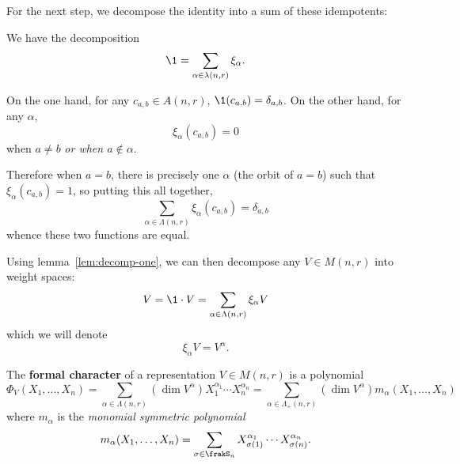 \documentclass[12pt]{article}
\begin{document}
For the next step, we decompose the identity into a sum of these idempotents:
\begin{lem}\label{lem:decomp-one}
	We have the decomposition 
	\[\1 = \sum_{\alpha\in\lambda(n,r)} \xi_\alpha.\]
\end{lem}
\begin{prf}
	On the one hand, for any $c_{a,b}\in A(n,r)$, $\1(c_{a,b})=\delta_{a,b}$. On the other hand, for any $\alpha$,
	\[\xi_\alpha(c_{a,b})=0\]
	when $a\ne b$ \textit{or when $a\notin \alpha$}. 
	
	Therefore when $a=b$, there is precisely one $\alpha$ (the orbit of $a=b$)
	such that $\xi_\alpha(c_{a,b})=1$, so putting this all together,
	\[\sum_{\alpha\in\Lambda(n,r)}\xi_\alpha(c_{a,b})=\delta_{a,b}\]
	whence these two functions are equal.
\end{prf}
\begin{rmk}\label{rmk-weight-spaces}
Using lemma~\ref{lem:decomp-one}, we can then decompose any $V\in M(n,r)$ into weight spaces:
\[V=\1\cdot V=\sum_{\alpha\in\Lambda(n,r)}\xi_\alpha V\]
which we will denote 
\[\xi_\alpha V=V^\alpha.\]
\end{rmk}

\begin{defn}\label{defn:character}
	The \textbf{formal character} of a representation $V\in M(n,r)$ is a polynomial 
	\[\Phi_V(X_1,\dots,X_n)=\sum_{\alpha\in\Lambda(n,r)}(\dim V^\alpha)X_1^{\alpha_1}\cdots X_n^{\alpha_n}=\sum_{\alpha\in\Lambda_+(n,r)}(\dim V^\alpha)m_\alpha(X_1,\dots,X_n)\]
	where $m_\alpha$ is the \textit{monomial symmetric polynomial}
	\[m_\alpha(X_1,\dots,X_n)=\sum_{\sigma\in\frakS_n}X_{\sigma(1)}^{\alpha_1}\cdots X_{\sigma(n)}^{\alpha_n}.\]
\end{defn}
\end{document}
